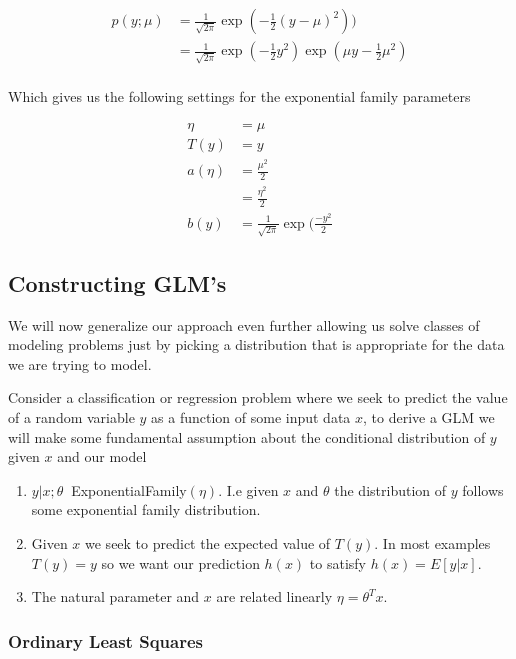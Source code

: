 \documentclass[11pt]{exam}
\begin{document}
\begin{align*}
p(y;\mu) &= \frac{1}{\sqrt{2\pi}} \exp(-\frac{1}{2}(y - \mu)^2))\\
&= \frac{1}{\sqrt{2\pi}} \exp(-\frac{1}{2}y^2) \exp(\mu y - \frac{1}{2}\mu^2)\\
\end{align*}

Which gives us the following settings for the exponential family parameters

\begin{align*}
\eta &= \mu\\
T(y) &= y\\
a(\eta) &= \frac{\mu^2}{2}\\
        &= \frac{\eta^2}{2}\\
b(y) &= \frac{1}{\sqrt{2\pi}}\exp(\frac{-y^2}{2}
\end{align*}

\subsection{Constructing GLM's}

We will now generalize our approach even further allowing us solve classes of modeling problems just by picking a distribution that is appropriate for the data we are trying to model.

Consider a classification or regression problem where we seek to predict the value of a random variable $y$ as a function of some input data $x$, to derive a GLM we will make some fundamental assumption about the conditional distribution of $y$ given $x$ and our model

\begin{enumerate}
\item $y | x;\theta ~$ ExponentialFamily$(\eta)$. I.e given $x$ and $\theta$ the distribution of $y$ follows some exponential family distribution.

\item Given $x$ we seek to predict the expected value of $T(y)$. In most examples $T(y) = y$ so we want our prediction $h(x)$ to satisfy $h(x) = E[y|x]$.

\item The natural parameter and $x$ are related linearly $\eta = \theta^Tx$.
\end{enumerate}

\subsubsection{Ordinary Least Squares}
\end{document}

